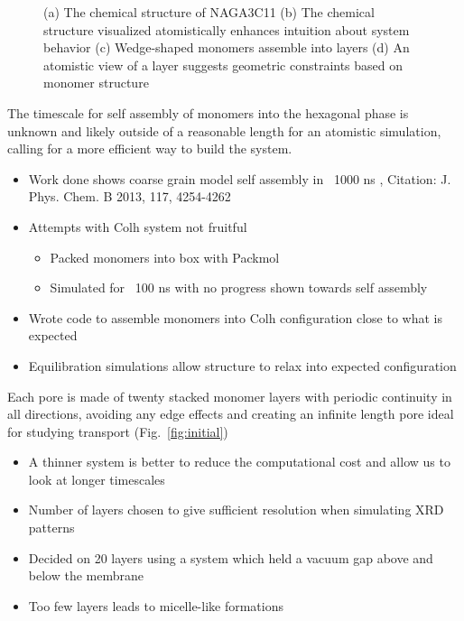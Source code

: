 \documentclass{article}
\begin{document}
\begin{figure}
\begin{subfigure}{.45\linewidth}
		\caption{}\label{fig:layeratomistic}
	\end{subfigure}
	\caption{(a) The chemical structure of NAGA3C11 (b) The chemical structure visualized atomistically enhances intuition about system behavior (c) Wedge-shaped monomers assemble into layers (d) An atomistic view of a layer suggests geometric constraints based on monomer structure}\label{fig:cartoonvatomistic}  
	\end{figure}	
	
	The timescale for self assembly of monomers into the hexagonal phase is unknown and likely outside of a reasonable length for an atomistic simulation, calling for a more efficient way to build the system. 
	\begin{itemize}
		\item Work done shows coarse grain model self assembly in ~1000 ns , Citation: J. Phys. Chem. B 2013, 117, 4254-4262
		\item Attempts with Colh system not fruitful  
		\begin{itemize}
			\item Packed monomers into box with Packmol
			\item Simulated for ~100 ns with no progress shown towards self assembly
		\end{itemize}  
		\item Wrote code to assemble monomers into Colh configuration close to what is expected 
		\item Equilibration simulations allow structure to relax into expected configuration 
	\end{itemize}
	
	Each pore is made of twenty stacked monomer layers with periodic continuity in all directions, avoiding any edge effects and creating an infinite length pore ideal for studying transport (Fig.~\ref{fig:initial})
	\begin{itemize}
		\item A thinner system is better to reduce the computational cost and allow us to look at longer timescales
		\item Number of layers chosen to give sufficient resolution when simulating XRD patterns
                \item Decided on 20 layers using a system which held a vacuum gap above and below the membrane
                \item Too few layers leads to micelle-like formations
	\end{itemize}
\end{document}
